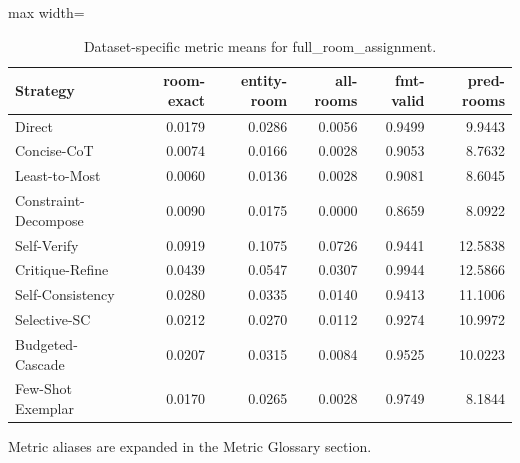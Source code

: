 \documentclass[10pt,twocolumn]{article}
\begin{document}
\begin{table}[t]
\centering
\caption{Dataset-specific metric means for full\_room\_assignment.}
\label{tab:full_room_assignment_dataset}
\begin{adjustbox}{max width=\textwidth}
\begin{tabular}{lrrrrr}
\toprule
Strategy & room-exact & entity-room & all-rooms & fmt-valid & pred-rooms \\
\midrule
Direct & 0.0179 & 0.0286 & 0.0056 & 0.9499 & 9.9443 \\
Concise-CoT & 0.0074 & 0.0166 & 0.0028 & 0.9053 & 8.7632 \\
Least-to-Most & 0.0060 & 0.0136 & 0.0028 & 0.9081 & 8.6045 \\
Constraint-Decompose & 0.0090 & 0.0175 & 0.0000 & 0.8659 & 8.0922 \\
Self-Verify & 0.0919 & 0.1075 & 0.0726 & 0.9441 & 12.5838 \\
Critique-Refine & 0.0439 & 0.0547 & 0.0307 & 0.9944 & 12.5866 \\
Self-Consistency & 0.0280 & 0.0335 & 0.0140 & 0.9413 & 11.1006 \\
Selective-SC & 0.0212 & 0.0270 & 0.0112 & 0.9274 & 10.9972 \\
Budgeted-Cascade & 0.0207 & 0.0315 & 0.0084 & 0.9525 & 10.0223 \\
Few-Shot Exemplar & 0.0170 & 0.0265 & 0.0028 & 0.9749 & 8.1844 \\
\bottomrule
\end{tabular}
\end{adjustbox}
\vspace{2pt}\parbox{0.98\textwidth}{\footnotesize Metric aliases are expanded in the Metric Glossary section.}
\end{table}
\end{document}

